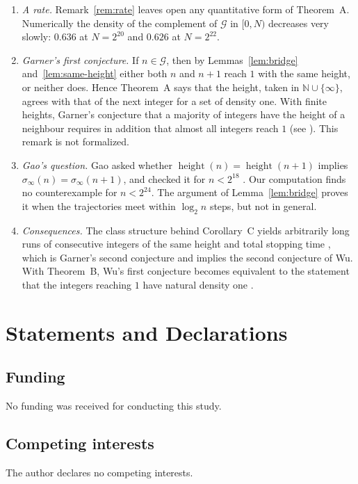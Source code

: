 \documentclass[11pt]{amsart}
\theoremstyle{definition}
\theoremstyle{remark}
\newcommand{\N}{\mathbb{N}}
\begin{document}
\begin{enumerate}
\item \emph{A rate.} Remark~\ref{rem:rate} leaves open any quantitative form of Theorem~A. Numerically the density of the complement of $\mathcal G$ in $[0,N)$ decreases very slowly: $0.636$ at $N=2^{20}$ and $0.626$ at $N=2^{22}$.
\item \emph{Garner's first conjecture.} If $n\in\mathcal G$, then by Lemmas~\ref{lem:bridge} and~\ref{lem:same-height} either both $n$ and $n+1$ reach $1$ with the same height, or neither does. Hence Theorem~A says that the height, taken in $\N\cup\{\infty\}$, agrees with that of the next integer for a set of density one. With finite heights, Garner's conjecture that a majority of integers have the height of a neighbour requires in addition that almost all integers reach $1$ (see \cite{SaidWu}). This remark is not formalized.
\item \emph{Gao's question.} Gao asked whether $\operatorname{height}(n)=\operatorname{height}(n+1)$ implies $\sigma_\infty(n)=\sigma_\infty(n+1)$, and checked it for $n<2^{18}$ \cite[p.~266]{Gao93}. Our computation finds no counterexample for $n<2^{24}$. The argument of Lemma~\ref{lem:bridge} proves it when the trajectories meet within $\log_2 n$ steps, but not in general.
\item \emph{Consequences.} The class structure behind Corollary~C yields arbitrarily long runs of consecutive integers of the same height and total stopping time \cite{SaidGarner}, which is Garner's second conjecture and implies the second conjecture of Wu. With Theorem~B, Wu's first conjecture becomes equivalent to the statement that the integers reaching $1$ have natural density one \cite{SaidWu}.
\end{enumerate}

\section*{Statements and Declarations}

\subsection*{Funding}
No funding was received for conducting this study.

\subsection*{Competing interests}
The author declares no competing interests.
\end{document}
